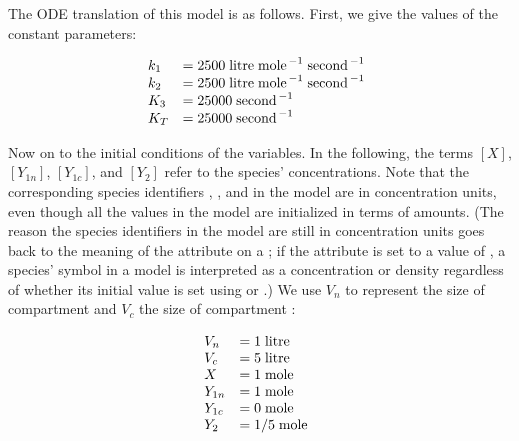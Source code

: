 The ODE translation of this model is as follows.  First, we give
the values of the constant parameters:
\begin{linenomath}
  \begin{equation*}
    \begin{array}{@{}lll@{}}
      k_1   & = 2500\; \unit{litre} \; \unit{mole}^{\,-1}\; \unit{second}^{\,-1}\\
      k_2   & = 2500\; \unit{litre} \; \unit{mole}^{\,-1}\; \unit{second}^{\,-1}\\
      K_3   & = 25000\; \unit{second}^{\,-1}\\
      K_T   & = 25000\; \unit{second}^{\,-1}\\
    \end{array}
  \end{equation*}
\end{linenomath}
Now on to the initial conditions of the variables.  In the
following, the terms $[X]$, $[Y_{1n}]$, $[Y_{1c}]$, and $[Y_2]$
refer to the species' concentrations.  Note that the corresponding
species identifiers , , 
and  in the model are in concentration units, even
though all the values in the model are initialized in terms of
amounts.  (The reason the species identifiers in the model are
still in concentration units goes back to the meaning of the
 attribute on a \Species; if the
attribute is set to a value of , a species' symbol in a
model is interpreted as a concentration or density regardless of
whether its initial value is set using  or
.)  We use $V_n$ to represent the size
of compartment  and $V_c$ the size of compartment
:
\begin{linenomath}
  \begin{equation*}
    \begin{array}{@{}lll@{}}
      V_n    & = 1\; \unit{litre}\\
      V_c    & = 5\; \unit{litre}\\
      X      & = 1\; \unit{mole}\\
      Y_{1n} & = 1\; \unit{mole}\\
      Y_{1c} & = 0\; \unit{mole}\\
      Y_2    & = 1/5\; \unit{mole}\\
    \end{array}
  \end{equation*}
\end{linenomath}
